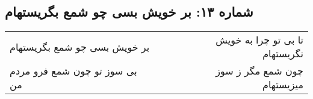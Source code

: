 \begin{center}
\section*{شماره ۱۳: بر خویش بسی چو شمع بگریستهام}
\label{sec:013}
\begin{longtable}{l p{0.5cm} r}
بر خویش بسی چو شمع بگریستهام
&&
تا بی تو چرا به خویش نگریستهام
\\
بی سوز تو چون شمع فرو مردم من
&&
چون شمع مگر ز سوز میزیستهام
\\
\end{longtable}
\end{center}

